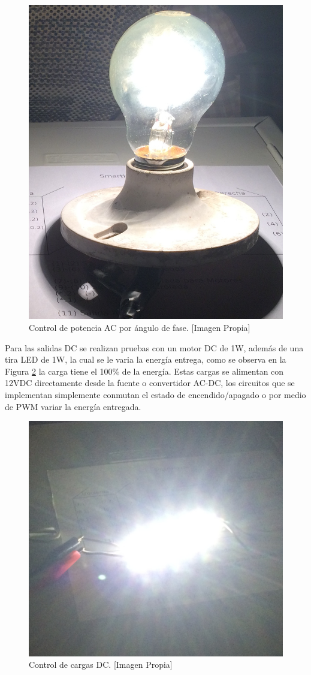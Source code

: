 \begin{figure}[H]
	\centering
	\caption[Control de potencia AC por ángulo de fase.]{Control de potencia AC por ángulo de fase. [Imagen Propia]}
	\label{fig:ACc}
	\includegraphics[width=0.7\linewidth]{Imagenes/AC1}
\end{figure}
 
Para las salidas DC se realizan pruebas con un motor DC de 1W, además de una tira LED de 1W, la cual se le varia la energía entrega, como se observa en la Figura \ref{fig:DCc} la carga tiene el 100\% de la energía. Estas cargas se alimentan con 12VDC directamente desde la fuente o convertidor AC-DC, los circuitos que se implementan simplemente conmutan el estado de encendido/apagado o por medio de PWM variar la energía entregada.\\

\begin{figure}[H]
	\centering
	\caption[Control de cargas DC.]{Control de cargas DC. [Imagen Propia]}
	\label{fig:DCc}
	\includegraphics[width=0.7\linewidth]{Imagenes/DC1}
\end{figure}

